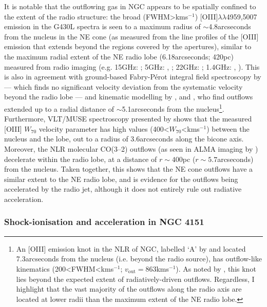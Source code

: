 It is notable that the outflowing gas in NGC appears to be spatially confined to the extent of the radio structure: the broad (FWHM\;\textgreater{}\;km\;s$^{-1}$) [OIII]$\lambda\lambda$4959,5007 emission in the G430L spectra is seen to a maximum radius of $\sim$4.8\;arcseconds from the nucleus in the NE cone (as measured from the line profiles of the [OIII] emission that extends beyond the regions covered by the apertures), similar to the maximum radial extent of the NE radio lobe (6.18\;arcseconds; 420\;pc) measured from radio imaging (e.g. 15\;GHz: \citealt{WilsonUlvestad1987}; 5\;GHz: \citealt{Wilson1983}, \citealt{Gallimore1996}; 22\;GHz: \citealt{Gallimore1996}; 1.4\;GHz: \citealt{Gallimore1996}, \citealt{GarciaBurillo2014}). This is also in agreement with ground-based Fabry-Pérot integral field spectroscopy by \citet{Cecil1990} --- which finds no significant velocity deviation from the systematic velocity beyond the radio lobe --- and kinematic modelling by \citet{Crenshaw2000_N1068}, \citet{Das2006} and \citet{Meena2023}, who find outflows extended up to a radial distance of $\sim$5.1\;arcseconds from the nucleus\footnote{An [OIII] emission knot in the NLR of NGC, labelled `A' by \citet{Meena2023} and located 7.3\;arcseconds from the nucleus (i.e. beyond the radio source), has outflow-like kinematics (200\;\textless\;FWHM\;\textless{}\;km\;s$^{-1}$; $v_\mathrm{out}=863$\;km\;s$^{-1}$). As noted by \citet{Meena2023}, this knot lies beyond the expected extent of radiatively-driven outflows. Regardless, I highlight that the vast majority of the outflows along the radio axis are located at lower radii than the maximum extent of the NE radio lobe.}. Furthermore, VLT/MUSE spectroscopy presented by \citet{Venturi2021} shows that the measured [OIII] $W_\mathrm{70}$ velocity parameter has high values \mbox{(400\;\textless\;[OIII]\;$W_\mathrm{70}$\;\textless{}\;km\;s$^{-1}$)} between the nucleus and the lobe, out to a radius of 3.6\;arcseconds along the bicone axis. Moreover, the NLR molecular CO(3--2) outflows (as seen in ALMA imaging by \citealt{GarciaBurillo2014}) decelerate within the radio lobe, at a distance of $r\sim400$\;pc ($r\sim5.7$\;arcseconds) from the nucleus. Taken together, this shows that the NE cone outflows have a similar extent to the NE radio lobe, and is evidence for the outflows being accelerated by the radio jet, although it does not entirely rule out radiative acceleration.

\subsubsection{Shock-ionisation and acceleration in NGC 4151}

